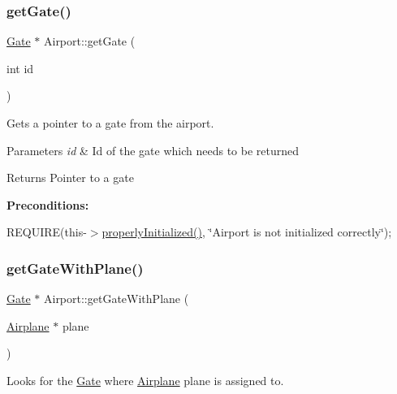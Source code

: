 \subsubsection{\texorpdfstring{get\+Gate()}{getGate()}}
{\footnotesize\ttfamily \mbox{\hyperlink{class_gate}{Gate}} $\ast$ Airport\+::get\+Gate (\begin{DoxyParamCaption}\item[{int}]{id }\end{DoxyParamCaption})}



Gets a pointer to a gate from the airport. 


\begin{DoxyParams}{Parameters}
{\em id} & Id of the gate which needs to be returned \\
\hline
\end{DoxyParams}
\begin{DoxyReturn}{Returns}
Pointer to a gate
\end{DoxyReturn}
{\bfseries Preconditions\+:}
\begin{DoxyItemize}
\item R\+E\+Q\+U\+I\+RE(this-\/$>$\mbox{\hyperlink{class_airport_aa13e68ac58e8875837fbe888325cfff6}{properly\+Initialized()}}, \char`\"{}\+Airport is not initialized correctly\char`\"{}); 
\end{DoxyItemize}\mbox{\label{class_airport_a29b9bed08d03a28f16ad645bb6d6a24b}} 
\subsubsection{\texorpdfstring{get\+Gate\+With\+Plane()}{getGateWithPlane()}}
{\footnotesize\ttfamily \mbox{\hyperlink{class_gate}{Gate}} $\ast$ Airport\+::get\+Gate\+With\+Plane (\begin{DoxyParamCaption}\item[{\mbox{\hyperlink{class_airplane}{Airplane}} $\ast$}]{plane }\end{DoxyParamCaption})}



Looks for the \mbox{\hyperlink{class_gate}{Gate}} where \mbox{\hyperlink{class_airplane}{Airplane}} plane is assigned to. 


